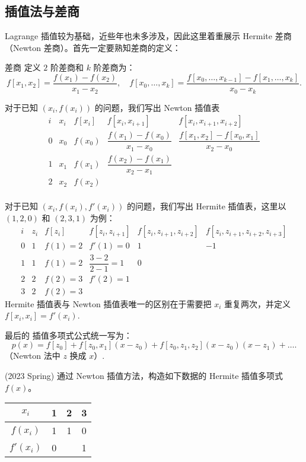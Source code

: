 \subsection*{插值法与差商}
Lagrange 插值较为基础，近些年也未多涉及，因此这里着重展示 Hermite 差商（Newton 差商）。首先一定要熟知差商的定义：
\begin{definition}{差商}{}
    定义 $2$ 阶差商和 $k$ 阶差商为：
    \[
        f[x_1,x_2] = \dfrac{f(x_1)-f(x_2)}{x_1-x_2},\quad f[x_0,\dots,x_k] = \dfrac{f[x_0,\dots,x_{k-1}]-f[x_1,\dots,x_{k}]}{x_0-x_k}.
    \]
\end{definition}

对于已知 $(x_i,f(x_i))$ 的问题，我们写出 Newton 插值表
\[
\begin{array}{c|c|c|c|c}
i & x_i & f[x_i] & f[x_i,x_{i+1}] & f[x_i,x_{i+1},x_{i+2}] \\
\hline
0 & x_0 & f(x_0) & \dfrac{f(x_1) - f(x_0)}{x_1 - x_0} & \dfrac{f[x_1,x_2] - f[x_0,x_1]}{x_2 - x_0}  \\
1 & x_1 & f(x_1) & \dfrac{f(x_2) - f(x_1)}{x_2 - x_1}  & \\
2 & x_2 & f(x_2) &   & \\
\end{array}
\]

对于已知 $(x_i,f(x_i),f'(x_i))$ 的问题，我们写出 Hermite 插值表，这里以 $(1,2,0)$ 和 $(2,3,1)$ 为例：
\[
\begin{array}{c|c|c|c|c|c}
i & z_i & f[z_i] & f[z_i,z_{i+1}] & f[z_i,z_{i+1},z_{i+2}] & f[z_i,z_{i+1},z_{i+2},z_{i+3}] \\
\hline
0 & 1 & f(1) = 2 & f'(1) = 0 & 1 & -1 \\
1 & 1 & f(1) = 2 & \dfrac{3 - 2}{2 - 1} = 1 & 0 & \\
2 & 2 & f(2) = 3 & f'(2) = 1 &   &  \\
3 & 2 & f(2) = 3 &           &   & 
\end{array}
\]
Hermite 插值表与 Newton 插值表唯一的区别在于需要把 $x_i$ 重复两次，并定义 $f[x_i,x_i] = f'(x_i)$.

最后的{\color{red} 插值多项式公式统一写为：
\[
    p(x) = f[z_0] + f[z_0,x_1](x-z_0)+f[z_0,z_1,z_2](x-z_0)(x-z_1) +\dots .
\]
（Newton 法中 $z$ 换成 $x$）.}

\begin{problembox}
    \begin{example}
        (2023 Spring) 
    通过 Newton 插值方法，构造如下数据的 Hermite 插值多项式 $f(x)$。
    
    \begin{center}
    \begin{tabular}{c|ccc}
        $x_i$ & 1 & 2 & 3 \\ \hline
        $f(x_i)$ & 1 & 1 & 0 \\
        $f'(x_i)$ & 0 & & 1 \\
    \end{tabular}
    \end{center}

    \end{example}
    \begin{solution}
        
    \end{solution}
\end{problembox}

